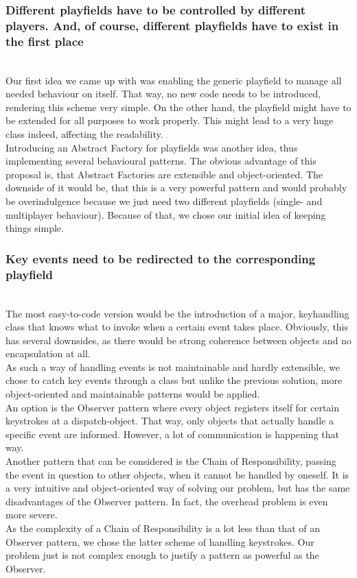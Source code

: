   \subsubsection{Different playfields have to be controlled by different players.
             And, of course, different playfields have to exist in the first place}
  ~\\
    Our first idea we came up with was enabling the generic playfield to manage all needed behaviour
    on itself. That way, no new code needs to be introduced, rendering this scheme very simple.
    On the other hand, the playfield might have to be extended for all purposes to work properly. 
    This might lead to a very huge class indeed, affecting the readability.\\
    Introducing an Abstract Factory for playfields was another idea, thus implementing several 
    behavioural patterns. The obvious advantage of this proposal is, that Abstract Factories 
    are extensible and object-oriented. The downside of it would be, that this is a very powerful 
    pattern and would probably be overindulgence because we just need two different playfields 
    (single- and multiplayer behaviour). Because of that, we chose our initial idea of keeping 
    things simple.

  \subsubsection{Key events need to be redirected to the corresponding playfield}
  ~\\
    The most easy-to-code version would be the introduction of a major, keyhandling class that
    knows what to invoke when a certain event takes place. Obviously, this has several downsides,
    as there would be strong coherence between objects and no encapsulation at all.\\
    As such a way of handling events is not maintainable and hardly extensible, we chose to catch
    key events through a class but unlike the previous solution, more object-oriented and maintainable
    patterns would be applied.\\
    An option is the Observer pattern where every object registers itself for certain keystrokes at
    a dispatch-object. That way, only objects that actually handle a specific event are informed.
    However, a lot of communication is happening that way.\\
    Another pattern that can be considered is the Chain of Responsibility, passing the event
    in question to other objects, when it cannot be handled by oneself. It is a very intuitive
    and object-oriented way of solving our problem, but has the same disadvantages of the 
    Observer pattern. In fact, the overhead problem is even more severe.\\
    As the complexity of a Chain of Responsibility is a lot less than that of an Observer pattern,
    we chose the latter scheme of handling keystrokes. Our problem just is not complex enough
    to justify a pattern as powerful as the Observer.
%

